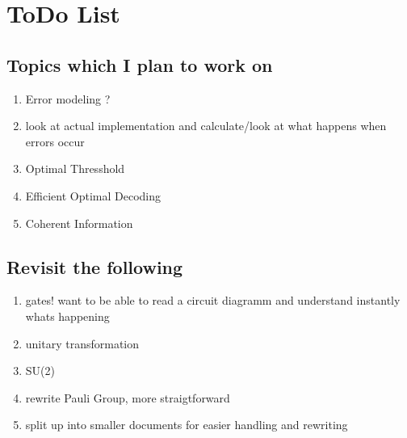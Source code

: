 \section{ToDo List}

\subsection{Topics which I plan to work on}

\begin{enumerate}
    \item Error modeling ? \cite{QECmemory}
    \item look at actual implementation and calculate/look at what happens when errors occur
    \item Optimal Thresshold
    \item Efficient Optimal Decoding
    \item Coherent Information
\end{enumerate}


\subsection{Revisit the following}

\begin{enumerate}
    \item gates! want to be able to read a circuit diagramm and understand instantly whats happening
    \item unitary transformation
    \item SU(2)
    \item rewrite Pauli Group, more straigtforward
    \item split up into smaller documents for easier handling and rewriting 
\end{enumerate}